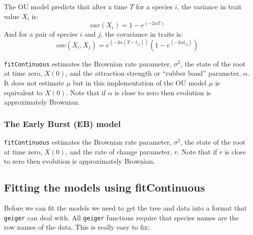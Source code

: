 \documentclass[11pt]{article}
\begin{document}
The OU model predicts that after a time $T$ for a species $i$, the variance in trait value $X_i$ is:
\begin{equation}
var(X_i) = 1 - e^{(-2\alpha T)}
\end{equation}
And for a pair of species $i$ and $j$, the covariance in traits is:
\begin{equation}
cov(X_i,X_j ) = e^{(-2\alpha (T-t_{ij} ))} (1 - e^{(-2\alpha t_{ij})})
\end{equation}


\texttt{fitContinuous} estimates the Brownian rate parameter, $\sigma^2$, the state of the root at time zero, $X(0)$, and the attraction strength or ``rubber band'' parameter, $\alpha$. It does not estimate $\mu$ but in this implementation of the OU model $\mu$ is equivalent to $X(0)$. Note that if $\alpha$ is close to zero then evolution is approximately Brownian.

\subsubsection{The Early Burst (EB) model}


\texttt{fitContinuous} estimates the Brownian rate parameter, $\sigma^2$, the state of the root at time zero, $X(0)$, and the rate of change parameter, $r$. Note that if $r$ is close to zero then evolution is approximately Brownian.

\subsection{Fitting the models using fitContinuous}

Before we can fit the models we need to get the tree and data into a format that \texttt{geiger} can deal with. All \texttt{geiger} functions require that species names are the row names of the data. This is really easy to fix:
\end{document}
